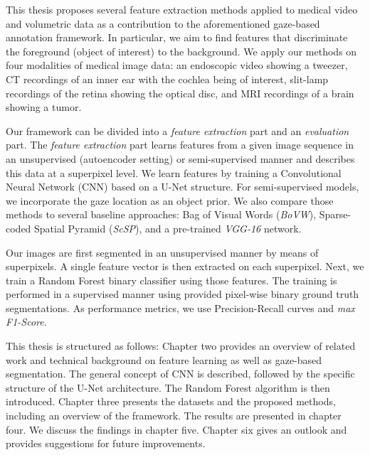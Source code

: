 This thesis proposes several feature extraction methods applied to medical video and volumetric data as a contribution to the aforementioned gaze-based annotation framework.
In particular, we aim to find features that discriminate the foreground (object of interest) to the background.
We apply our methods on four modalities of medical image data: an endoscopic video showing a tweezer, CT recordings of an inner ear with the cochlea being of interest, slit-lamp recordings of the retina showing the optical disc, and MRI recordings of a brain showing a tumor.

Our framework can be divided into a \textit{feature extraction} part and an \textit{evaluation} part. The \textit{feature extraction} part learns features from a given image sequence in an unsupervised (autoencoder setting) or semi-supervised manner and describes this data at a superpixel level. We learn features by training a Convolutional Neural Network (CNN) based on a U-Net \cite{Ronneberger2015} structure. For semi-supervised models, we incorporate the gaze location as an object prior. We also compare those methods to several baseline approaches: Bag of Visual Words (\textit{BoVW}), Sparse-coded Spatial Pyramid (\textit{ScSP}), and a pre-trained \textit{VGG-16} network. 

Our images are first segmented in an unsupervised manner by means of superpixels. A single feature vector is then extracted on each superpixel. Next, we train a Random Forest binary classifier using those features. The training is performed in a supervised manner using provided pixel-wise binary ground truth segmentations. As performance metrics, we use Precision-Recall curves and \textit{max F1-Score}.

This thesis is structured as follows: Chapter two provides an overview of related work and technical background on feature learning as well as gaze-based segmentation. The general concept of CNN is described, followed by the specific structure of the U-Net architecture. The Random Forest algorithm is then introduced. Chapter three presents the datasets and the proposed methods, including an overview of the framework. The results are presented in chapter four. We discuss the findings in chapter five. Chapter six gives an outlook and provides suggestions for future improvements.

\endinput
